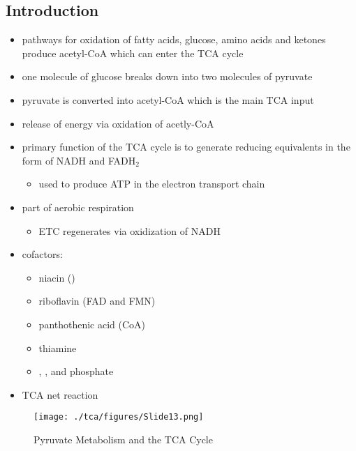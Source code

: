 \documentclass{scrartcl}
\begin{document}
\subsection{Introduction}
\label{sec:org722f262}
\begin{itemize}
\item pathways for oxidation of fatty acids, glucose, amino acids and
ketones produce acetyl-CoA which can enter the TCA cycle
\item one molecule of glucose breaks down into two molecules of pyruvate
\item pyruvate is converted into acetyl-CoA which is the main TCA input
\item release of energy via oxidation of acetly-CoA
\item primary function of the TCA cycle is to generate reducing
equivalents in the form of NADH and FADH\(_{\text{2}}\)
\begin{itemize}
\item used to produce ATP in the electron transport chain
\end{itemize}
\end{itemize}

\centering
{}
\begin{itemize}
\item part of aerobic respiration
\begin{itemize}
\item ETC regenerates  via oxidization of NADH
\end{itemize}
\item cofactors:
\begin{itemize}
\item niacin ()
\item riboflavin (FAD and FMN)
\item panthothenic acid (CoA)
\item thiamine
\item {}, ,  and phosphate
\end{itemize}
\item TCA net reaction
\end{itemize}

{\tiny{}}

\begin{figure}[htbp]
\centering
\texttt{[image: ./tca/figures/Slide13.png]}
\caption[TCA]{\label{fig:org5084527}
Pyruvate Metabolism and the TCA Cycle}
\end{figure}
\end{document}
